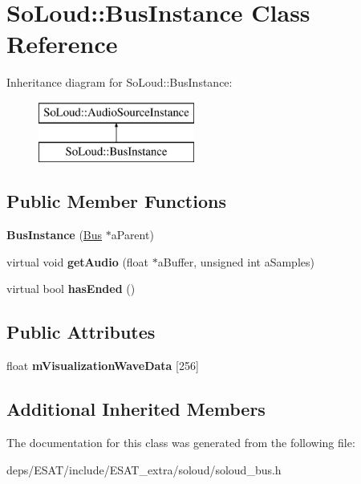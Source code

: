 \hypertarget{class_so_loud_1_1_bus_instance}{}\section{So\+Loud\+:\+:Bus\+Instance Class Reference}
\label{class_so_loud_1_1_bus_instance}
Inheritance diagram for So\+Loud\+:\+:Bus\+Instance\+:\begin{figure}[H]
\begin{center}
\leavevmode
\includegraphics[height=2.000000cm]{class_so_loud_1_1_bus_instance}
\end{center}
\end{figure}
\subsection*{Public Member Functions}
\begin{DoxyCompactItemize}
\item 
\mbox{\label{class_so_loud_1_1_bus_instance_a4bd198344ac6013b8814d6d5a199a39e}} 
{\bfseries Bus\+Instance} (\mbox{\hyperlink{class_so_loud_1_1_bus}{Bus}} $\ast$a\+Parent)
\item 
\mbox{\label{class_so_loud_1_1_bus_instance_abb28a81c6c19a528852db281178521ab}} 
virtual void {\bfseries get\+Audio} (float $\ast$a\+Buffer, unsigned int a\+Samples)
\item 
\mbox{\label{class_so_loud_1_1_bus_instance_ab8f4d736266bc1d0503a46a9793f824b}} 
virtual bool {\bfseries has\+Ended} ()
\end{DoxyCompactItemize}
\subsection*{Public Attributes}
\begin{DoxyCompactItemize}
\item 
\mbox{\label{class_so_loud_1_1_bus_instance_a02aa0be39eec9ce8986dbc6e0bc87e2b}} 
float {\bfseries m\+Visualization\+Wave\+Data} \mbox{[}256\mbox{]}
\end{DoxyCompactItemize}
\subsection*{Additional Inherited Members}


The documentation for this class was generated from the following file\+:\begin{DoxyCompactItemize}
\item 
deps/\+E\+S\+A\+T/include/\+E\+S\+A\+T\+\_\+extra/soloud/soloud\+\_\+bus.\+h\end{DoxyCompactItemize}
